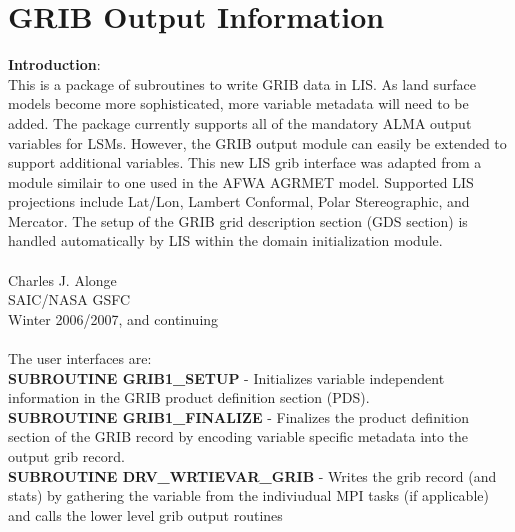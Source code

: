 \section{GRIB Output Information } \label{sec:writegrib_appendix}

\textbf{Introduction}: \\
This is a package of subroutines to write GRIB data in LIS.  As land surface
models become more sophisticated, more variable metadata will need to be
added. The package currently supports all of the mandatory ALMA output variables for
LSMs.  However, the GRIB output module can easily be extended to support additional
variables.  This new LIS grib interface was adapted
from a module similair to one used in the AFWA AGRMET model.  Supported
LIS projections include Lat/Lon, Lambert Conformal, Polar Stereographic, and
Mercator.  The setup of the GRIB grid description section (GDS section) is handled
automatically by LIS within the domain initialization module. \\
\\
Charles J. Alonge \\
SAIC/NASA GSFC        \\
Winter 2006/2007, and continuing \\
\\
The user interfaces are:  \\
\textbf{SUBROUTINE GRIB1\_SETUP }
 - Initializes variable independent information in the GRIB product definition
 section (PDS). \\
\textbf{SUBROUTINE GRIB1\_FINALIZE }
 - Finalizes the product definition section of the GRIB record by encoding
 variable specific metadata into the output grib record.\\
\textbf{SUBROUTINE DRV\_WRTIEVAR\_GRIB }
 - Writes the grib record (and stats) by gathering the variable from the
  indiviudual MPI tasks (if applicable) and calls the lower level grib
  output routines

